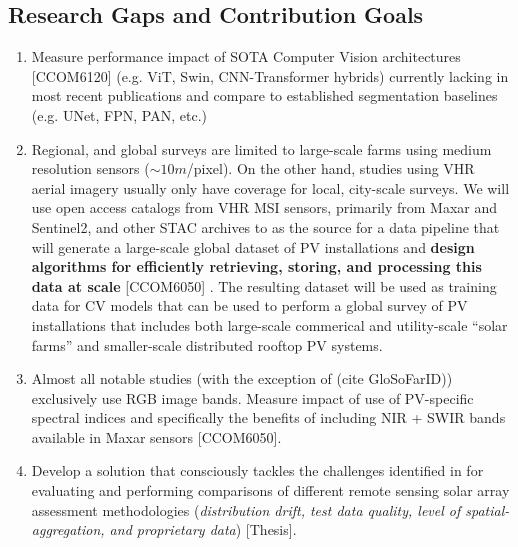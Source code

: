 \begin{multicols}{2}
\subsection{Research Gaps and Contribution Goals}
    \begin{enumerate}
        \item Measure performance impact of SOTA Computer Vision architectures [CCOM6120] (e.g. ViT, Swin, CNN-Transformer hybrids) currently lacking in most recent publications and compare to established segmentation baselines (e.g. UNet, FPN, PAN, etc.)
        \item Regional, and global surveys are limited to large-scale farms using medium resolution sensors ($\sim10m$/pixel). On the other hand, studies using VHR aerial imagery usually only have coverage for local, city-scale surveys. We will use open access catalogs from VHR MSI sensors, primarily from Maxar and Sentinel2, and other STAC archives to as the source for a data pipeline that will generate a large-scale global dataset of PV installations and \textbf{design algorithms for efficiently retrieving, storing, and processing this data at scale} [CCOM6050] . 
        The resulting dataset will be used as training data for CV models that can be used to perform a global survey of PV installations that includes both large-scale commerical and utility-scale ``solar farms'' and smaller-scale distributed rooftop PV systems.
        \item Almost all notable studies (with the exception of (cite GloSoFarID)) exclusively use RGB image bands. Measure impact of use of PV-specific spectral indices\cite{He_universal_pv_spectral_index_2024} and specifically the benefits of including NIR + SWIR bands available in Maxar sensors [CCOM6050]. 
        \item Develop a solution that consciously tackles the challenges identified in \cite{Hu_solar_array_pitfalls_2022} for evaluating and performing comparisons of different remote sensing solar array assessment methodologies 
        (\textit{distribution drift, test data quality, level of spatial-aggregation, and proprietary data}) [Thesis].
    \end{enumerate}


\end{multicols}




